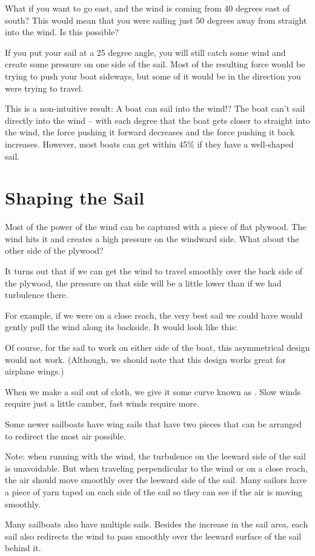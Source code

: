 What if you want to go east,  and the wind is coming from 40 degrees east of south?  This would mean that you were sailing just 50 degrees away from 
straight into the wind.   Is this possible?

If you put your sail at a 25 degree angle,   you will still catch some wind and create some pressure on one side of the sail.  Most of the resulting force would be trying to push
your boat sideways,  but some of it would be in the direction you were trying to travel. 

This is a non-intuitive result: A boat can sail into the wind!?  The boat can't sail directly into the wind -- with each degree that the boat gets closer
to straight into the wind,  the force pushing it forward decreases and the force pushing it back increases.   However,  most boats can get within 45\% if they have a well-shaped sail.

\section{Shaping the Sail}

Most of the power of the wind can be captured with a piece of flat plywood.  The wind hits it and creates a high pressure on the windward side.   What about the other side of the plywood?

It turns out that if we can get the wind to travel smoothly over the back side of the plywood,   the pressure on that side will be a little lower than if we had turbulence there. 

For example,   if we were on a close reach,   the very best sail we could have would gently pull the wind along its backside.  It would look like this:

Of course,   for the sail to work on either side of the boat,  this asymmetrical design would not work.  (Although,  we should note that this design works great
for airplane wings.)

When we make a sail out of cloth,  we give it some curve known as .  Slow winds require just a little camber,  fast winds require more.

Some newer sailboats have wing sails that have two pieces that can be arranged to redirect the most air possible.

Note: when running with the wind,  the turbulence on the leeward side of the sail is unavoidable.   But when traveling perpendicular to the wind or on a close reach,  the air should move smoothly over the leeward side of the sail.   Many sailors have a piece of yarn taped on each side of the sail so they can see if the air is moving smoothly.

Many sailboats also have multiple sails.  Besides the increase in the sail area,  each sail also redirects the wind to pass smoothly over the leeward surface of the sail
behind it.

